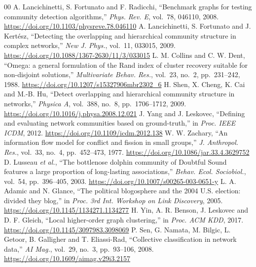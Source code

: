 \documentclass[conference]{IEEEtran}
\begin{document}
\begin{thebibliography}{00}
 A. Lancichinetti, S. Fortunato and F. Radicchi, ``Benchmark graphs for testing community detection algorithms,'' \emph{Phys. Rev. E}, vol.~78, 046110, 2008. \url{https://doi.org/10.1103/physreve.78.046110}
 A. Lancichinetti, S. Fortunato and J. Kert\'esz, ``Detecting the overlapping and hierarchical community structure in complex networks,'' \emph{New J. Phys.}, vol.~11, 033015, 2009. \url{https://doi.org/10.1088/1367-2630/11/3/033015}
 L. M. Collins and C. W. Dent, ``Omega: a general formulation of the Rand index of cluster recovery suitable for non-disjoint solutions,'' \emph{Multivariate Behav. Res.}, vol.~23, no.~2, pp.~231--242, 1988. \url{https://doi.org/10.1207/s15327906mbr2302_6}
 H. Shen, X. Cheng, K. Cai and M.-B. Hu, ``Detect overlapping and hierarchical community structure in networks,'' \emph{Physica A}, vol.~388, no.~8, pp.~1706--1712, 2009. \url{https://doi.org/10.1016/j.physa.2008.12.021}
 J. Yang and J. Leskovec, ``Defining and evaluating network communities based on ground-truth,'' in \emph{Proc. IEEE ICDM}, 2012. \url{https://doi.org/10.1109/icdm.2012.138}
 W. W. Zachary, ``An information flow model for conflict and fission in small groups,'' \emph{J. Anthropol. Res.}, vol.~33, no.~4, pp.~452--473, 1977. \url{https://doi.org/10.1086/jar.33.4.3629752}
 D. Lusseau \emph{et al.}, ``The bottlenose dolphin community of Doubtful Sound features a large proportion of long-lasting associations,'' \emph{Behav. Ecol. Sociobiol.}, vol.~54, pp.~396--405, 2003. \url{https://doi.org/10.1007/s00265-003-0651-y}
 L. A. Adamic and N. Glance, ``The political blogosphere and the 2004 U.S. election: divided they blog,'' in \emph{Proc. 3rd Int. Workshop on Link Discovery}, 2005. \url{https://doi.org/10.1145/1134271.1134277}
 H. Yin, A. R. Benson, J. Leskovec and D. F. Gleich, ``Local higher-order graph clustering,'' in \emph{Proc. ACM KDD}, 2017. \url{https://doi.org/10.1145/3097983.3098069}
 P. Sen, G. Namata, M. Bilgic, L. Getoor, B. Galligher and T. Eliassi-Rad, ``Collective classification in network data,'' \emph{AI Mag.}, vol.~29, no.~3, pp.~93--106, 2008. \url{https://doi.org/10.1609/aimag.v29i3.2157}
\end{thebibliography}
\end{document}

